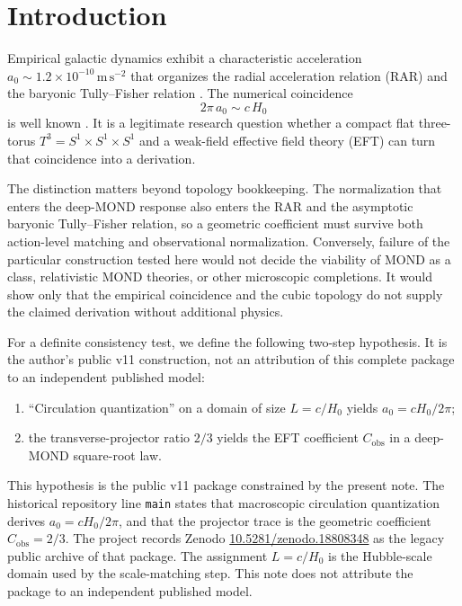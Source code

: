 \documentclass[aps,prd,reprint,superscriptaddress,nofootinbib,floatfix,showkeys]{revtex4-2}
\newcommand{\Tthree}{T^{3}}
\newcommand{\Cobs}{C_{\mathrm{obs}}}
\newcommand{\azero}{a_{0}}
\newcommand{\Hzero}{H_{0}}
\begin{document}
\section{Introduction}
\label{sec:intro}

Empirical galactic dynamics exhibit a characteristic acceleration
\(\azero\sim 1.2\times 10^{-10}\,\mathrm{m\,s^{-2}}\) that organizes the
radial acceleration relation (RAR) and the baryonic Tully--Fisher relation
\cite{mond,famaey_mcgaugh,mcgaugh_rar,lelli_rar}.
The numerical coincidence
\begin{equation}
  2\pi\,\azero \sim c\,\Hzero
  \label{eq:coincidence}
\end{equation}
is well known \cite{mond,famaey_mcgaugh}.  It is a legitimate research question
whether a compact flat three-torus \(\Tthree=S^{1}\times S^{1}\times S^{1}\)
\cite{lachieze_rey_luminet,planck_topology} and a weak-field effective field
theory (EFT) can turn that coincidence into a derivation.

The distinction matters beyond topology bookkeeping.  The normalization that
enters the deep-MOND response also enters the RAR and the asymptotic baryonic
Tully--Fisher relation, so a geometric coefficient must survive both
action-level matching and observational normalization.  Conversely, failure
of the particular construction tested here would not decide the viability of
MOND as a class, relativistic MOND theories, or other microscopic completions.
It would show only that the empirical coincidence and the cubic topology do
not supply the claimed derivation without additional physics.

For a definite consistency test, we define the following two-step hypothesis.
It is the author's public v11 construction, not an attribution of this complete
package to an independent published model:
\begin{enumerate}
\item[(A)] ``Circulation quantization'' on a domain of size \(L=c/\Hzero\)
  yields \(\azero=c\Hzero/2\pi\);
\item[(B)] the transverse-projector ratio \(2/3\) yields the EFT coefficient
  \(\Cobs\) in a deep-MOND square-root law.
\end{enumerate}

This hypothesis is the public v11 package constrained by the present note.
The historical repository line \texttt{main} states that macroscopic
circulation quantization derives \(\azero=c\Hzero/2\pi\), and that the
projector trace is the geometric coefficient \(\Cobs=2/3\).
The project records Zenodo
\href{https://doi.org/10.5281/zenodo.18808348}{10.5281/zenodo.18808348}
as the legacy public archive of that package.
The assignment \(L=c/\Hzero\) is the Hubble-scale domain used by the
scale-matching step. This note does not attribute the package to an
independent published model.
\end{document}

